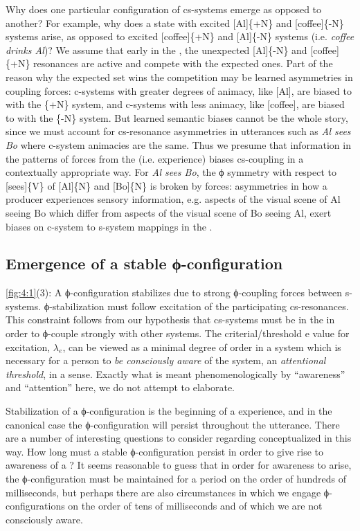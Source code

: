   Why does one particular configuration of cs-systems emerge as opposed to another? For example, why does a state with excited [Al]\{+N\} and [coffee]\{-N\} systems arise, as opposed to excited [coffee]\{+N\} and [Al]\{-N\} systems (i.e. \textit{coffee drinks Al})? We assume that early in the , the unexpected [Al]\{-N\} and [coffee]\{+N\} resonances are active and compete with the expected ones. Part of the reason why the expected set wins the competition may be learned asymmetries in coupling forces: c-systems with greater degrees of animacy, like [Al], are biased to  with the \{+N\} system, and c-systems with less animacy, like [coffee], are biased to  with the \{-N\} system. But learned semantic biases cannot be the whole story, since we must account for cs-resonance asymmetries in utterances such as \textit{Al sees Bo} where c-system animacies are the same. Thus we presume that information in the patterns of forces from the  (i.e.  experience) biases cs-coupling in a contextually appropriate way. For \textit{Al sees Bo}, the ϕ symmetry with respect to [sees]\{V\} of [Al]\{N\} and [Bo]\{N\} is broken by  forces: asymmetries in how a producer experiences sensory information, e.g. aspects of the visual scene of Al seeing Bo which differ from aspects of the visual scene of Bo seeing Al, exert biases on c-system to s-system mappings in the .

\subsection{Emergence of a stable ϕ-configuration}

\ref{fig:4:1}(3): A ϕ-configuration stabilizes due to strong ϕ{}-coupling forces between s-systems. ϕ{}-stabilization must follow excitation of the participating cs-resonances. This constraint follows from our hypothesis that cs-systems must be in the  in order to ϕ-couple strongly with other systems. The criterial/threshold e value for excitation, $\lambda_{e}$, can be viewed as a minimal degree of order in a system which is necessary for a person to \textit{be consciously aware} of the system, an \textit{attentional threshold}, in a sense. Exactly what is meant phenomenologically by “awareness” and “attention” here, we do not attempt to elaborate. 

   Stabilization of a ϕ-configuration is the beginning of a  experience, and in the canonical case the ϕ-configuration will persist throughout the utterance. There are a number of interesting questions to consider regarding  conceptualized in this way. How long must a stable ϕ-configuration persist in order to give rise to awareness of a ? It seems reasonable to guess that in order for awareness to arise, the ϕ-configuration must be maintained for a period on the order of hundreds of milliseconds, but perhaps there are also circumstances in which we engage ϕ-configurations on the order of tens of milliseconds and of which we are not consciously aware.

